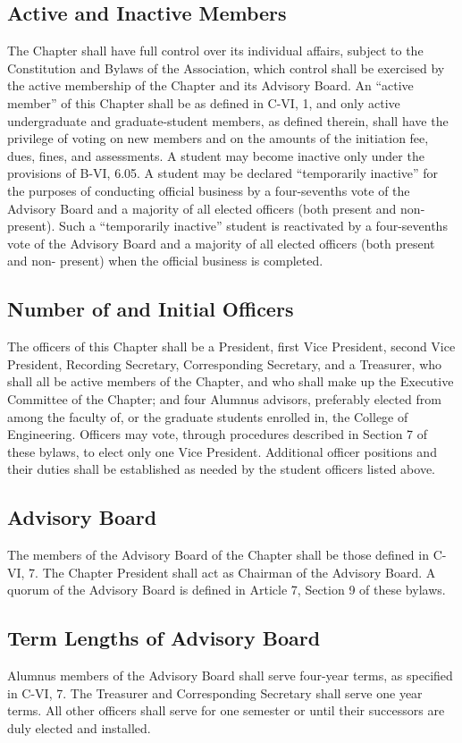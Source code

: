\documentclass{article}
\begin{document}
	\subsection{Active and Inactive Members}
	The Chapter shall have full control over its individual affairs, subject to the Constitution and Bylaws of the Association, which control shall be exercised by the active membership of the Chapter and its Advisory Board. An ``active member'' of this Chapter shall be as defined in C-VI, 1, and only active undergraduate and graduate-student members, as defined therein, shall have the privilege of voting on new members and on the amounts of the initiation fee, dues, fines, and assessments. A student may become inactive only under the provisions of B-VI, 6.05. A student may be declared ``temporarily inactive'' for the purposes of conducting official business by a four-sevenths vote of the Advisory Board and a majority of all elected officers (both present and non-present). Such a ``temporarily inactive'' student is reactivated by a four-sevenths vote of the Advisory Board and a majority of all elected officers (both present and non- present) when the official business is completed.
	\subsection{Number of and Initial Officers}
	The officers of this Chapter shall be a President, first Vice President, second Vice President, Recording Secretary, Corresponding Secretary, and a Treasurer, who shall all be active members of the Chapter, and who shall make up the Executive Committee of the Chapter; and four Alumnus advisors, preferably elected from among the faculty of, or the graduate students enrolled in, the College of Engineering. Officers may vote, through procedures described in Section 7 of these bylaws, to elect only one Vice President. Additional officer positions and their duties shall be established as needed by the student officers listed above.
	\subsection{Advisory Board}
	The members of the Advisory Board of the Chapter shall be those defined in C-VI, 7. The Chapter President shall act as Chairman of the Advisory Board. A quorum of the Advisory Board is defined in Article 7, Section 9 of these bylaws.
	\subsection{Term Lengths of Advisory Board}
	Alumnus members of the Advisory Board shall serve four-year terms, as specified in C-VI, 7. The Treasurer and Corresponding Secretary shall serve one year terms. All other officers shall serve for one semester or until their successors are duly elected and installed.
\end{document}
